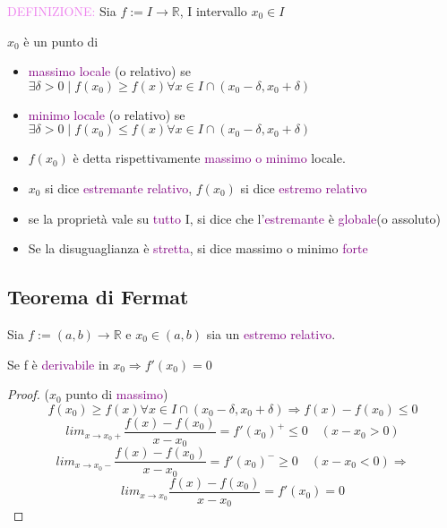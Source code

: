 \documentclass{article}
\begin{document}
\begin{tcolorbox}[colback = pink!10!white,   colframe=red!50!blue]
  \textcolor{violet}{DEFINIZIONE: }
  Sia $f:= I \to \mathbb{R} $, I intervallo $x_0 \in I$

  $x_0 $ è un punto di
  \begin{itemize}
      \item \textcolor{purple}{massimo locale} (o relativo)  se $\exists \delta >0 \mid f(x_0) \ge f(x) \forall x \in I \cap (x_0 - \delta, x_0 + \delta)$
      \item \textcolor{purple}{minimo locale} (o relativo) se $\exists \delta >0 \mid f(x_0) \le f(x) \forall x \in I \cap (x_0 - \delta, x_0 + \delta)$
  \end{itemize}
\end{tcolorbox}
\begin{itemize}
    \item $f(x_0)$ è detta rispettivamente \textcolor{purple}{massimo o minimo} locale.
    \item $x_0$ si dice \textcolor{purple}{estremante relativo}, $f(x_0)$ si dice \textcolor{purple}{estremo relativo} 
    \item se la proprietà vale su \textcolor{purple}{tutto }I, si dice che l'\textcolor{purple}{estremante} è \textcolor{purple}{globale}(o assoluto)
    \item Se la disuguaglianza è \textcolor{purple}{stretta}, si dice massimo o minimo \textcolor{purple}{forte}
\end{itemize}

\subsection{Teorema di Fermat}

      \begin{tcolorbox}[colback= red!15!yellow!5!white, colframe=red]

Sia $f:= (a,b) \to \mathbb{R} $ e $x_0 \in (a,b)$ sia un \textcolor{purple}{estremo relativo}.

Se f è \textcolor{purple}{derivabile} in $x_0 \Rightarrow f'(x_0) = 0$

\end{tcolorbox}

\begin{proof} 
($x_0$ punto di \textcolor{purple}{massimo})
\[f(x_0) \ge f(x) \forall x \in I \cap (x_0 - \delta, x_0 + \delta) \Rightarrow f(x)-f(x_0) \le 0\]
    \[lim_{x \to x_0+} \frac{f(x) - f(x_0)}{x - x_0}= f'(x_0)^+ \le 0 \quad (x -x_0 > 0) \]
    \[lim_{x \to x_0-} \frac{f(x) - f(x_0)}{x - x_0}= f'(x_0)^- \ge 0 \quad (x -x_0 < 0)  \Rightarrow\]
    \[lim_{x \to x_0} \frac{f(x) - f(x_0)}{x - x_0}= f'(x_0)=0\]
    
\end{proof}
\end{document}
